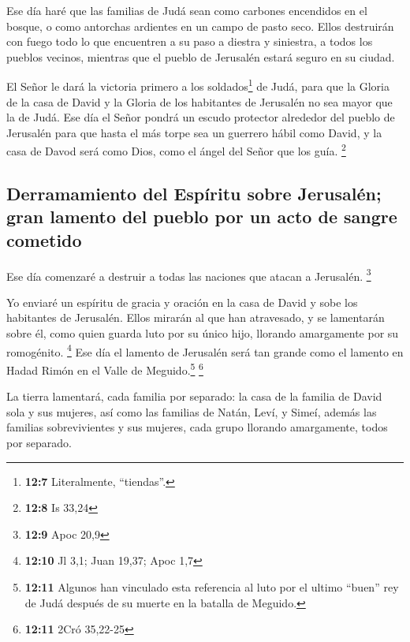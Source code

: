  Ese día haré que las familias de Judá sean como carbones
encendidos en el bosque, o como antorchas ardientes en un campo de pasto
seco. Ellos destruirán con fuego todo lo que encuentren a su paso a
diestra y siniestra, a todos los pueblos vecinos, mientras que el pueblo
de Jerusalén estará seguro en su ciudad.

 El Señor le dará la victoria primero a los
soldados\footnote{\textbf{12:7} Literalmente, ``tiendas''.} de Judá,
para que la Gloria de la casa de David y la Gloria de los habitantes de
Jerusalén no sea mayor que la de Judá.  Ese día el Señor
pondrá un escudo protector alrededor del pueblo de Jerusalén para que
hasta el más torpe sea un guerrero hábil como David, y la casa de Davod
será como Dios, como el ángel del Señor que los guía. \footnote{\textbf{12:8}
  Is 33,24}

\hypertarget{derramamiento-del-espuxedritu-sobre-jerusaluxe9n-gran-lamento-del-pueblo-por-un-acto-de-sangre-cometido}{%
\subsection{Derramamiento del Espíritu sobre Jerusalén; gran lamento del
pueblo por un acto de sangre
cometido}\label{derramamiento-del-espuxedritu-sobre-jerusaluxe9n-gran-lamento-del-pueblo-por-un-acto-de-sangre-cometido}}

 Ese día comenzaré a destruir a todas las naciones que
atacan a Jerusalén. \footnote{\textbf{12:9} Apoc 20,9}

 Yo enviaré un espíritu de gracia y oración en la casa de
David y sobe los habitantes de Jerusalén. Ellos mirarán al que han
atravesado, y se lamentarán sobre él, como quien guarda luto por su
único hijo, llorando amargamente por su romogénito. \footnote{\textbf{12:10}
  Jl 3,1; Juan 19,37; Apoc 1,7}  Ese día el lamento de
Jerusalén será tan grande como el lamento en Hadad Rimón en el Valle de
Meguido.\footnote{\textbf{12:11} Algunos han vinculado esta referencia
  al luto por el ultimo ``buen'' rey de Judá después de su muerte en la
  batalla de Meguido.} \footnote{\textbf{12:11} 2Cró 35,22-25}

 La tierra lamentará, cada familia por separado: la casa
de la familia de David sola y sus mujeres, así como las familias de
Natán,  Leví, y Simeí,  además las
familias sobrevivientes y sus mujeres, cada grupo llorando amargamente,
todos por separado.

